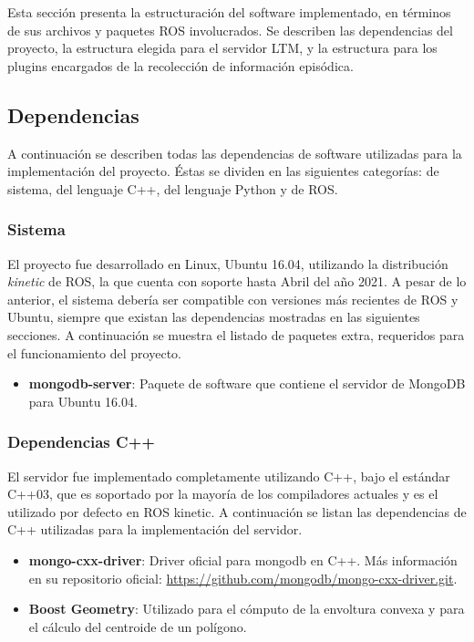 Esta sección presenta la estructuración del software implementado, en términos de sus archivos y paquetes ROS involucrados. Se describen las dependencias del proyecto, la estructura elegida para el servidor LTM, y la estructura para los plugins encargados de la recolección de información episódica.

\subsection{Dependencias}

A continuación se describen todas las dependencias de software utilizadas para la implementación del proyecto. Éstas se dividen en las siguientes categorías: de sistema, del lenguaje C++, del lenguaje Python y de ROS.


\subsubsection{Sistema}

El proyecto fue desarrollado en Linux, Ubuntu 16.04, utilizando la distribución \textit{kinetic} de ROS, la que cuenta con soporte hasta Abril del año 2021. A pesar de lo anterior, el sistema debería ser compatible con versiones más recientes de ROS y Ubuntu, siempre que existan las dependencias mostradas en las siguientes secciones. A continuación se muestra el listado de paquetes extra, requeridos para el funcionamiento del proyecto.

\begin{itemize}
\item {\bfseries mongodb-server}: Paquete de software que contiene el servidor de MongoDB para Ubuntu 16.04.
\end{itemize}


\subsubsection{Dependencias C++}

El servidor fue implementado completamente utilizando C++, bajo el estándar C++03, que es soportado por la mayoría de los compiladores actuales y es el utilizado por defecto en ROS kinetic. A continuación se listan las dependencias de C++ utilizadas para la implementación del servidor.

\begin{itemize}
	\item {\bfseries mongo-cxx-driver}: Driver oficial para mongodb en C++. Más información en su repositorio oficial: \url{https://github.com/mongodb/mongo-cxx-driver.git}. 
	\item {\bfseries Boost Geometry}: Utilizado para el cómputo de la envoltura convexa y para el cálculo del centroide de un polígono.
\end{itemize}


